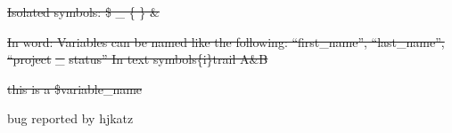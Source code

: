 \documentclass{article}
\providecommand{\DIFdel}[1]{{\protect\color{red}\sout{#1}}}                      %
\providecommand{\DIFdelbegin}{} %
\providecommand{\DIFdelend}{} %
\begin{document}
\DIFdelbegin \DIFdel{Isolated symbols: \$  \_ \{ \} \&
}%

\DIFdel{In word: Variables can be named like the following: ``first\_name'', ``last\_name'', ``project}%
\DIFdel{\_}%
\DIFdel{status''
In text symbols\{i\}trail A\&B
}%

\DIFdel{this is a \$variable\_name
}\DIFdelend 

bug reported by hjkatz
\end{document}
